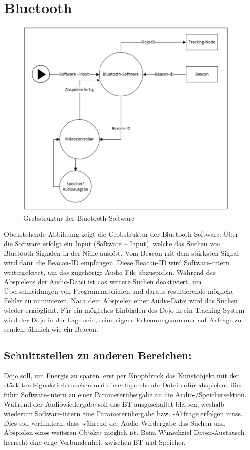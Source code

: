 \section{Bluetooth}

\begin{figure}[H]
\begin{center}
	\includegraphics[width=120mm]{data/Bluetooth.png}
	\caption{Grobstruktur der Bluetooth-Software} %
	\label{fig:first_layer}
\end{center}
\end{figure}

Obenstehende Abbildung zeigt die Grobstruktur der Bluetooth-Software. Über die Software erfolgt ein Input (Software – Input), welche das Suchen von Bluetooth Signalen in der Nähe auslöst. Vom Beacon mit dem stärksten Signal wird dann die Beacon-ID empfangen. Diese Beacon-ID wird Software-intern weitergeleitet, um das zugehörige Audio-File abzuspielen. Während des Abspielens der Audio-Datei ist das weitere Suchen deaktiviert, um Überschneidungen von Programmabläufen und daraus resultierende mögliche Fehler zu minimieren. Nach dem Abspielen einer Audio-Datei wird das Suchen wieder ermöglicht. Für ein mögliches Einbinden des Dojo in ein Tracking-System wird der Dojo in der Lage sein, seine eigene Erkennungsnummer auf Anfrage zu senden, ähnlich wie ein Beacon. 
\subsection{Schnittstellen zu anderen Bereichen:}
Dojo soll, um Energie zu sparen, erst per Knopfdruck das Kunstobjekt mit der stärksten Signalstärke suchen und die entsprechende Datei dafür abspielen. Dies führt Software-intern zu einer Parameterübergabe an die Audio-/Speichersektion. Während der Audiowiedergabe soll das BT ausgeschaltet bleiben, weshalb wiederum Software-intern eine Parameterübergabe bzw. -Abfrage erfolgen muss. Dies soll verhindern, dass während der Audio-Wiedergabe das Suchen und Abspielen eines weiteren Objekts möglich ist. Beim Wunschziel Daten-Austausch herrscht eine enge Verbundenheit zwischen BT und Speicher. 
